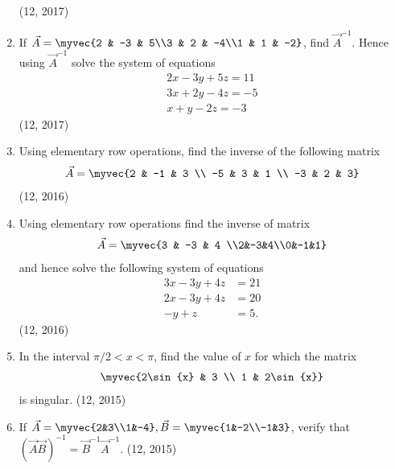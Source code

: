 \begin{enumerate}[label=\thesubsection.\arabic*,ref=\thesubsection.\theenumi]
\begin{align*}
\end{align*} 
\hfill (12, 2017)
 \item If $\vec{A}=\myvec{2 & -3 & 5\\3 & 2 & -4\\1 & 1 & -2}$, find $\vec{A}^{-1}$. Hence using $\vec{A}^{-1}$ solve the system of equations \begin{align*}
    2x-3y+5z=11\\3x+2y-4z=-5\\x+y-2z=-3
\end{align*}
\hfill (12, 2017)
    \item Using elementary row operations, find the inverse of the following matrix 
          \begin{align*}
              \vec{A} = \myvec{2 & -1 & 3  \\
              -5           & 3  & 1  \\
              -3           & 2  & 3}
          \end{align*}
\hfill (12, 2016)
    \item Using elementary row operations find the inverse of matrix
          \begin{align*}
              \vec{A} =\myvec{3 & -3 & 4 \\2&-3&4\\0&-1&1}
          \end{align*}
          and hence solve the following system of equations
          \begin{align*}
              3x-3y+4z & =21 \\
              2x-3y+4z & =20 \\
              -y+z     & =5.
          \end{align*}
\hfill (12, 2016)
\item In the interval ${\pi}/2<x<\pi$, find the value of $x$ for which the matrix 
\begin{align*}
	\myvec{2\sin{x} & 3 \\ 1 & 2\sin{x}}
\end{align*}
 is singular.
\hfill (12, 2015)
\item If $\vec{A} = \myvec{2&3\\1&-4}, \vec{B} = \myvec{1&-2\\-1&3}$, verify that $(\vec{A}\vec{B})^{-1} = \vec{B}^{-1}\vec{A}^{-1}$. 
\hfill (12, 2015)

\end{enumerate}
